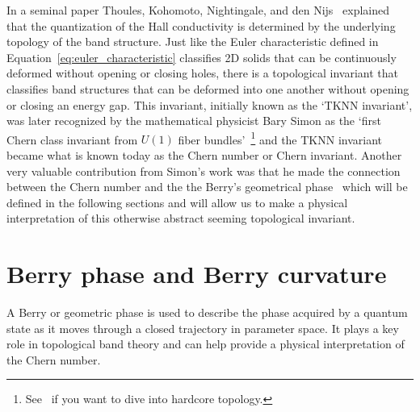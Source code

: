 In a seminal paper Thoules, Kohomoto, Nightingale, and den Nijs~\cite{thouless_quantized_1982} explained that the quantization of the Hall conductivity is determined by the underlying topology of the band structure. Just like the Euler characteristic defined in Equation~\ref{eq:euler_characteristic} classifies 2D solids that can be continuously deformed without opening or closing holes, there is a topological invariant that classifies band structures that can be deformed into one another without opening or closing an energy gap. This invariant, initially known as the `TKNN invariant', was later recognized by the mathematical physicist Bary Simon as the `first Chern class invariant from $U(1)$ fiber bundles'~\cite{simon_holonomy_1983}\footnote{See~\cite{geometry_topology_physics} if you want to dive into hardcore topology.} and the TKNN invariant became what is known today as the Chern number or Chern invariant. Another very valuable contribution from Simon's work was that he made the connection between the Chern number and the the Berry's geometrical phase~\cite{berry_michael_victor_quantal_1984} which will be defined in the following sections and will allow us to make a physical interpretation of this otherwise abstract seeming topological invariant. 

\section{Berry phase and Berry curvature}
\label{sec:Berry phase and curvature}

A Berry or geometric phase is used to describe the phase acquired by a quantum state as it moves through a closed trajectory in parameter space. It plays a key role in topological band theory and can help provide a physical interpretation of the Chern number. 

